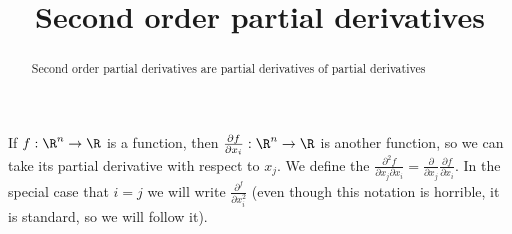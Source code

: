 \documentclass{ximera}
\title{Second order partial derivatives}
\begin{document}
	\begin{abstract}
		Second order partial derivatives are partial derivatives of partial derivatives
	\end{abstract}
	
	\begin{definition}
		If $f:\R^n \to \R$ is a function, then $\frac{\partial f}{\partial x_i}:\R^n \to \R$ is another function, so we can take its partial derivative with respect to $x_j$.
		We define the  $\frac{\partial^2 f}{\partial x_j \partial x_i} = \frac{\partial}{\partial x_j} \frac{\partial f}{\partial x_i}$.  In the special case
		that $i=j$ we will write $\frac{\partial^f}{\partial x_i^2}$ (even though this notation is horrible, it is standard, so we will follow it).
	\end{definition}
	
\end{document}
